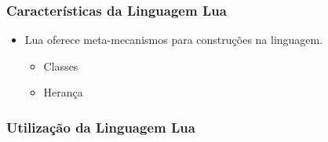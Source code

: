 \documentclass{beamer}
\begin{document}
\begin{frame}
    \frametitle{Caracter\'isticas da Linguagem Lua}
    
    \begin{itemize}
        \item Lua oferece meta-mecanismos para construções na linguagem.
        \begin{itemize} Exemplo de orientação a objetos:
                    \item Classes
                    \item Herança
        \end{itemize}
            
      
    \end{itemize}
    
   
    
\end{frame}

\begin{frame}
    \frametitle{Utiliza\c{c}\~ao da Linguagem Lua}
   
    
\end{frame}
    
\end{document}

